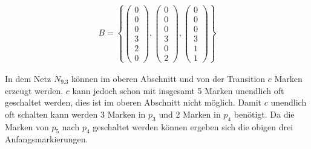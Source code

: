 \documentclass[12pt,a4paper]{../krautsourcing/homework}
\author{Ruben Felgenhauer,\\Alexander Hildebrandt,\\Leonhard Reichenbach}
\begin{document}
\makeheadline

\addtocounter{section}{2}

\section{}

\subsection{}

\begin{align*}
B = 
\left\lbrace \begin{pmatrix}
0\\0\\0\\3\\2\\0
\end{pmatrix},
\begin{pmatrix}
0\\0\\0\\3\\0\\2
\end{pmatrix},
\begin{pmatrix}
0\\0\\0\\3\\1\\1
\end{pmatrix} \right\rbrace
\end{align*}

In dem Netz \(N_{9.3}\) können im oberen Abschnitt und von der Transition \(c\) Marken erzeugt werden. \(c\) kann jedoch schon mit insgesamt 5 Marken unendlich oft geschaltet werden, dies ist im oberen Abschnitt nicht möglich. Damit \(c\) unendlich oft schalten kann werden 3 Marken in \(p_3\) und 2 Marken in \(p_4\) benötigt. Da die Marken von \(p_5\) nach \(p_4\) geschaltet werden können ergeben sich die obigen drei Anfangsmarkierungen.

\subsection{}
\end{document}
